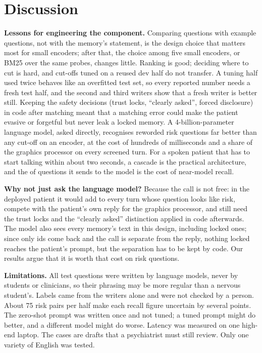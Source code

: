 \documentclass[sn-mathphys-num]{sn-jnl}
\begin{document}
\section{Discussion}\label{sec:disc}
\textbf{Lessons for engineering the component.} Comparing questions with example questions, not with the memory's statement, is the design
choice that matters most for small encoders; after that, the choice among five small encoders, or BM25 over the same probes, changes little.
Ranking is good; deciding where to cut is hard, and cut-offs tuned on a reused dev half do not transfer. A tuning half used twice behaves like
an overfitted test set, so every reported number needs a fresh test half, and the second and third writers show that a fresh writer is better
still. Keeping the safety decisions (trust locks, ``clearly asked'', forced disclosure) in code after matching meant that a matching error could
make the patient evasive or forgetful but never leak a locked memory. A 4-billion-parameter language model, asked directly, recognises reworded risk
questions far better than any cut-off on an encoder, at the cost of hundreds of milliseconds and a share of the graphics processor on every
screened turn. For a spoken patient that has to start talking within about two seconds, a cascade is the practical architecture, and the
\numCasShare{} of questions it sends to the model is the cost of near-model recall.

\textbf{Why not just ask the language model?} Because the call is not free: in the deployed patient it would add to every turn whose question
looks like risk, compete with the patient's own reply for the graphics processor, and still need the trust locks and the ``clearly asked''
distinction applied in code afterwards. The model also sees every memory's text in this design, including locked ones; since only ids come back
and the call is separate from the reply, nothing locked reaches the patient's prompt, but the separation has to be kept by code. Our results argue
that it is worth that cost on risk questions.

\textbf{Limitations.} All test questions were written by language models, never by students or clinicians, so their phrasing may be more
regular than a nervous student's. Labels came from the writers alone and were not checked by a person. About 75
risk pairs per half make each recall figure uncertain by several points. The zero-shot prompt was written once and not tuned; a tuned prompt might
do better, and a different model might do worse. Latency was measured on one high-end laptop. The cases are drafts that a psychiatrist must
still review. Only one variety of English was tested.
\end{document}

